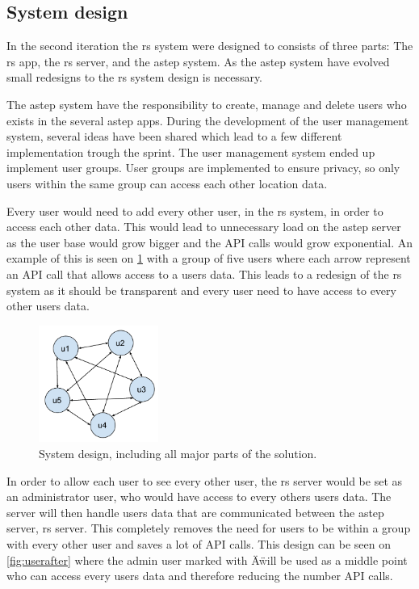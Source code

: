\subsection{System design}
In the second iteration the \gls{rs} system were designed to consists of three parts: The \gls{rs} app, the \gls{rs} server, and the \gls{astep} system.
As the \gls{astep} system have evolved small redesigns to the \gls{rs} system design is necessary.

The \gls{astep} system have the responsibility to create, manage and delete users who exists in the several \gls{astep} apps.
During the development of the user management system, several ideas have been shared which lead to a few different implementation trough the sprint.
The user management system ended up implement user groups.
User groups are implemented to ensure privacy, so only users within the same group can access each other location data.

Every user would need to add every other user, in the \gls{rs} system, in order to access each other data.
This would lead to unnecessary load on the \gls{astep} server as the user base would grow bigger and the API calls would grow exponential.
An example of this is seen on \ref{fig:userbefore} with a group of five users where each arrow represent an API call that allows access to a users data.
This leads to a redesign of the \gls{rs} system as it should be transparent and every user need to have access to every other users data.

\begin{figure}[!h]
	\centering
	\includegraphics[width=0.35\textwidth]{figures/userbefore.pdf}
	\caption{System design, including all major parts of the solution.}
	\label{fig:userbefore}
\end{figure}

In order to allow each user to see every other user, the \gls{rs} server would be set as an administrator user, who would have access to every others users data.
The server will then handle users data that are communicated between the \gls{astep} server, \gls{rs} server. 
This completely removes the need for users to be within a group with every other user and saves a lot of API calls.
This design can be seen on \ref{fig:userafter} where the admin user marked with \"A\" will be used as a middle point who can access every users data and therefore reducing the number API calls.


